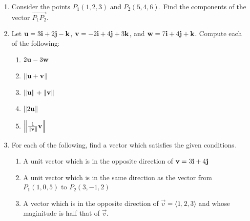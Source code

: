 \documentclass[12pt]{article}
\newif\ifans
\begin{document}
\begin{enumerate}
\item Consider the points $P_1(1,2,3)$ and $P_2(5,4,6)$.  Find the components of the vector $\overrightarrow{P_1P_2}$.

\ifans{\fbox{$\overrightarrow{P_1P_2}=\langle 4,2,3 \rangle$}} \fi

\item Let ${\bf u}= 3{\bf i}+2{\bf j}-{\bf k}$, ${\bf v}=-2{\bf i}+4{\bf j}+3{\bf k}$, and ${\bf w}=7{\bf i}+4{\bf j}+{\bf k}$.  Compute each of the following:

\begin{enumerate}

\item $2{\bf u}-3{\bf w}$

\ifans{\fbox{$-15{\bf i}-8{\bf j}-5{\bf k}$}} \fi

\item $\| {\bf u}+{\bf v}\|$

\ifans{\fbox{$\sqrt{41}$}} \fi

\item $\| {\bf u}\|+\|{\bf v}\|$

\ifans{\fbox{$\sqrt{14}+\sqrt{29}$}} \fi

\item $\|2{\bf u}\|$

\ifans{\fbox{$2\sqrt{14}$}} \fi

\item $\left\|\frac{1}{\|{\bf v}\|}{\bf v}\right\|$

\ifans{\fbox{1}} \fi

\end{enumerate}

\item For each of the following, find a vector which satisfies the given conditions.

\begin{enumerate}

\item A unit vector which is in the opposite direction of ${\bf v}=3{\bf i}+4{\bf j}$

\ifans{\fbox{$-\frac{3}{5}{\bf i}-\frac{4}{5}{\bf j}$}} \fi

\item A unit vector which is in the same direction as the vector from $P_1(1,0,5)$ to $P_2(3,-1,2)$

\ifans{\fbox{$\left \langle \frac{2}{\sqrt{14}},-\frac{1}{\sqrt{14}},-\frac{3}{\sqrt{14}} \right \rangle$}} \fi

\item A vector which is in the opposite direction of $\overrightarrow{v}=\langle1,2,3\rangle$ and whose maginitude is half that of $\overrightarrow{v}$.


\end{enumerate}
\end{enumerate}
\end{document}

